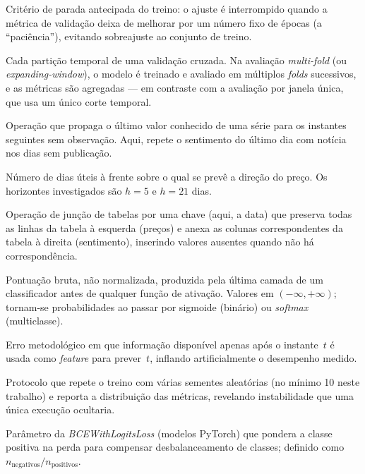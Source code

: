 \begin{description}[style=nextline,leftmargin=0pt,labelindent=0pt]
\item[\textit{Early stopping}] Critério de parada antecipada do treino: o ajuste é interrompido quando a métrica de validação deixa de melhorar por um número fixo de épocas (a ``paciência''), evitando sobreajuste ao conjunto de treino.

\item[\textit{Fold}] Cada partição temporal de uma validação cruzada. Na avaliação \textit{multi-fold} (ou \textit{expanding-window}), o modelo é treinado e avaliado em múltiplos \textit{folds} sucessivos, e as métricas são agregadas --- em contraste com a avaliação por janela única, que usa um único corte temporal.

\item[\textit{Forward-fill} (preenchimento para a frente)] Operação que propaga o último valor conhecido de uma série para os instantes seguintes sem observação. Aqui, repete o sentimento do último dia com notícia nos dias sem publicação.

\item[$h$ (horizonte)] Número de dias úteis à frente sobre o qual se prevê a direção do preço. Os horizontes investigados são $h=5$ e $h=21$ dias.

\item[\textit{Left join}] Operação de junção de tabelas por uma chave (aqui, a data) que preserva todas as linhas da tabela à esquerda (preços) e anexa as colunas correspondentes da tabela à direita (sentimento), inserindo valores ausentes quando não há correspondência.

\item[\textit{Logit}] Pontuação bruta, não normalizada, produzida pela última camada de um classificador antes de qualquer função de ativação. Valores em $(-\infty, +\infty)$; tornam-se probabilidades ao passar por sigmoide (binário) ou \textit{softmax} (multiclasse).

\item[\textit{Look-ahead} (vazamento temporal)] Erro metodológico em que informação disponível apenas após o instante~$t$ é usada como \textit{feature} para prever~$t$, inflando artificialmente o desempenho medido.

\item[\textit{Multi-seed} (multissemente)] Protocolo que repete o treino com várias sementes aleatórias (no mínimo 10 neste trabalho) e reporta a distribuição das métricas, revelando instabilidade que uma única execução ocultaria.

\item[\textit{pos\_weight}] Parâmetro da \textit{BCEWithLogitsLoss} (modelos PyTorch) que pondera a classe positiva na perda para compensar desbalanceamento de classes; definido como $n_\text{negativos}/n_\text{positivos}$.


\end{description}
